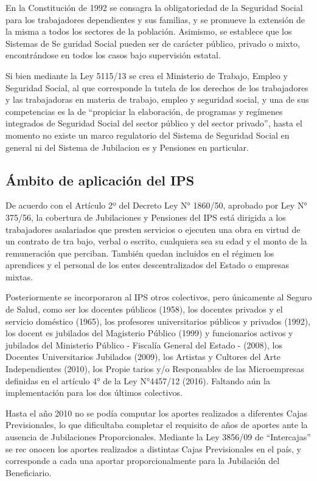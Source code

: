 En la Constitución de 1992 se consagra la obligatoriedad de la Seguridad
Social para los trabajadores dependientes y sus familias, y se promueve
la extensión de la misma a todos los sectores de la población. Asimismo,
se establece que los Sistemas de Se guridad Social pueden ser de
carácter público, privado o mixto, encontrándose en todos los casos bajo
supervisión estatal.

Si bien mediante la Ley 5115/13 se crea el Ministerio de Trabajo, Empleo
y Seguridad Social, al que corresponde la tutela de los derechos de los
trabajadores y las trabajadoras en materia de trabajo, empleo y
seguridad social, y una de sus competencias es la de ``propiciar la
elaboración, de programas y regímenes integrados de Seguridad Social del
sector público y del sector privado'', hasta el momento no existe un
marco regulatorio del Sistema de Seguridad Social en general ni del
Sistema de Jubilacion es y Pensiones en particular.

\subsection{Ámbito de aplicación del IPS}

De acuerdo con el Artículo 2º del Decreto Ley N° 1860/50, aprobado por
Ley N° 375/56, la cobertura de Jubilaciones y Pensiones del IPS está
dirigida a los trabajadores asalariados que presten servicios o ejecuten
una obra en virtud de un contrato de tra bajo, verbal o escrito,
cualquiera sea su edad y el monto de la remuneración que perciban.
También quedan incluidos en el régimen los aprendices y el personal de
los entes descentralizados del Estado o empresas mixtas.

Posteriormente se incorporaron al IPS otros colectivos, pero únicamente
al Seguro de Salud, como ser los docentes públicos (1958), los docentes
privados y el servicio doméstico (1965), los profesores universitarios
públicos y privados (1992), los docent es jubilados del Magisterio
Público (1999) y funcionarios activos y jubilados del Ministerio Público
- Fiscalía General del Estado - (2008), los Docentes Universitarios
Jubilados (2009), los Artistas y Cultores del Arte Independientes
(2010), los Propie tarios y/o Responsables de las Microempresas
definidas en el artículo 4° de la Ley N°4457/12 (2016). Faltando aún la
implementación para los dos últimos colectivos.

Hasta el año 2010 no se podía computar los aportes realizados a
diferentes Cajas Previsionales, lo que dificultaba completar el
requisito de años de aportes ante la ausencia de Jubilaciones
Proporcionales. Mediante la Ley 3856/09 de ``Intercajas'' se rec onocen
los aportes realizados a distintas Cajas Previsionales en el país, y
corresponde a cada una aportar proporcionalmente para la Jubilación del
Beneficiario.

